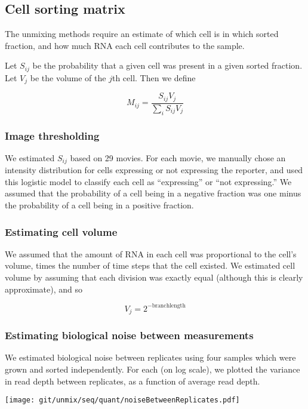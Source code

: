 \documentclass{article}
\begin{document}
\subsection*{Cell sorting matrix}

The unmixing methods require an estimate of which cell is in which sorted fraction,
and how much RNA each cell contributes to the sample.

Let $S_{ij}$ be
the probability that a given cell was present in a given sorted fraction. Let $V_j$
be the volume of the $j$th cell. Then we define

\[
M_{ij} = \frac{S_{ij} V_j}{ \sum\limits_{i}^{} S_{ij} V_j }
\]


\subsubsection*{Image thresholding}

We estimated $S_{ij}$ based on 29 movies.
For each movie, we manually chose an intensity distribution for cells expressing
or not expressing the reporter, and 
used this logistic model to classify each cell as ``expressing'' or ``not expressing.''
We assumed that the probability of a cell being in a negative fraction was
one minus the probability of a cell being in a positive fraction.

\subsubsection*{Estimating cell volume}

We assumed that the amount of RNA in each cell was proportional to the cell's volume,
times the number of time steps that the cell existed.
We estimated cell volume by assuming that each division was exactly equal (although
this is clearly approximate), and so

\[
V_j = 2^{-\mathrm{branchlength}}
\]

\subsubsection*{Estimating biological noise between measurements}

We estimated biological noise between replicates using four samples which were
grown and sorted independently. For each (on log scale), we plotted the variance
in read depth between replicates, as a function of average read depth.

\texttt{[image: git/unmix/seq/quant/noiseBetweenReplicates.pdf]}
\end{document}
